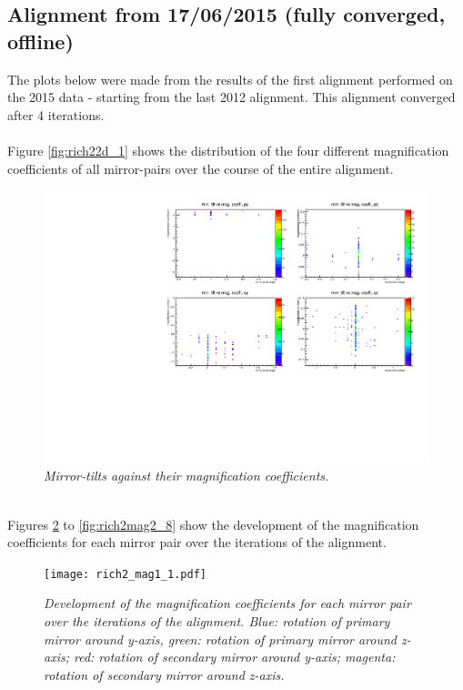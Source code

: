 \subsection{Alignment from 17/06/2015 (fully converged, offline)}
The plots below were made from the results of the first alignment performed on the 2015 data - starting from the last 2012 alignment. This alignment converged after 4 iterations.\\\\
Figure \ref{fig:rich22d_1} shows the distribution of the four different magnification coefficients of all mirror-pairs over the course of the entire alignment.\\
\begin{figure}[!ht]
	\vspace*{-0.cm}
	\begin{center}
		\includegraphics[width=1.\textwidth]{2dplot_rich2_1.pdf}
		\vspace*{-1.5cm}
	\end{center}
	\caption{\textit{Mirror-tilts against their magnification coefficients.}}
	\label{fig:rich22d_2}
\end{figure}
\\
Figures \ref{fig:rich2mag1_1} to \ref{fig:rich2mag2_8} show the development of the magnification coefficients for each mirror pair over the iterations of the alignment.\\
\begin{figure}[!ht]
	\vspace*{-0.cm}
	\begin{center}
		\texttt{[image: rich2\_mag1\_1.pdf]}
		\vspace*{-1.5cm}
	\end{center}
	\caption{\textit{Development of the magnification coefficients for each mirror pair over the iterations of the alignment. Blue: rotation of primary mirror around y-axis, green: rotation of primary mirror around z-axis; red: rotation of secondary mirror around y-axis; magenta: rotation of secondary mirror around z-axis.}}
	\label{fig:rich2mag1_1}
\end{figure}

